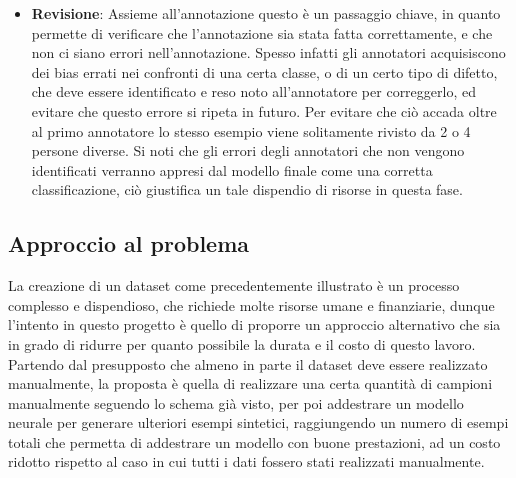 \begin{itemize}
    \item \textbf{Revisione}: Assieme all'annotazione questo è un passaggio chiave, in quanto permette di verificare che l'annotazione sia stata fatta correttamente,
        e che non ci siano errori nell'annotazione. Spesso infatti gli annotatori acquisiscono dei bias errati nei confronti di una certa classe, o di un certo tipo di difetto, 
        che deve essere identificato e reso noto all'annotatore per correggerlo, ed evitare che questo errore si ripeta in futuro.
        Per evitare che ciò accada oltre al primo annotatore lo stesso esempio viene solitamente rivisto da 2 o 4 persone diverse.
        Si noti che gli errori degli annotatori che non vengono identificati verranno appresi dal modello finale come una corretta classificazione, ciò giustifica un tale 
        dispendio di risorse in questa fase.
\end{itemize} 

\subsection{Approccio al problema \ok}

La creazione di un dataset come precedentemente illustrato è un processo complesso e dispendioso, che richiede molte risorse umane e finanziarie,
dunque l'intento in questo progetto è quello di proporre un approccio alternativo che sia in grado di ridurre per quanto possibile la durata e il costo
di questo lavoro.
Partendo dal presupposto che almeno in parte il dataset deve essere realizzato manualmente, la proposta è quella di realizzare una certa 
quantità di campioni manualmente seguendo lo schema già visto, per poi addestrare un modello neurale per generare ulteriori esempi sintetici,
raggiungendo un numero di esempi totali che permetta di addestrare un modello con buone prestazioni, ad un costo ridotto rispetto al caso in cui
tutti i dati fossero stati realizzati manualmente.

